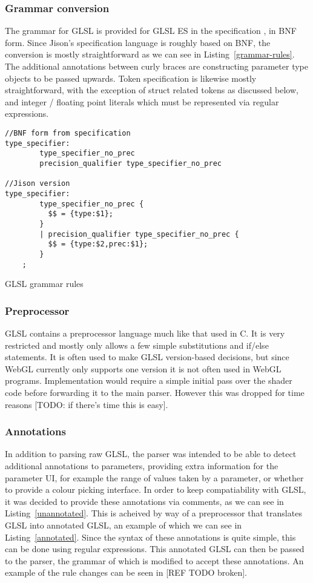 \documentclass[12pt,twoside,notitlepage]{report}
\begin{document}
\subsubsection{Grammar conversion}
The grammar for GLSL is provided for GLSL ES in the specification \cite{glsl-spec}, in BNF form. Since Jison's specification language is roughly based on BNF, the conversion is mostly straightforward as we can see in Listing~\ref{grammar-rules}. The additional annotations between curly braces are constructing parameter type objects to be passed upwards. Token specification is likewise mostly straightforward, with the exception of struct related tokens as discussed below, and integer / floating point literals which must be represented via regular expressions.

\begin{listing}
\label{grammar-rules}
\begin{verbatim}
//BNF form from specification
type_specifier:
        type_specifier_no_prec
        precision_qualifier type_specifier_no_prec

//Jison version
type_specifier:
        type_specifier_no_prec { 
          $$ = {type:$1}; 
        }
        | precision_qualifier type_specifier_no_prec { 
          $$ = {type:$2,prec:$1}; 
        }
	;
\end{verbatim}
\caption{GLSL grammar rules}
\end{listing}

\subsubsection{Preprocessor}
GLSL contains a preprocessor language much like that used in C. It is very restricted and mostly only allows a few simple substitutions and if/else statements. It is often used to make GLSL version-based decisions, but since WebGL currently only supports one version it is not often used in WebGL programs. Implementation would require a simple initial pass over the shader code before forwarding it to the main parser. However this was dropped for time reasons [TODO: if there's time this is easy].

\subsubsection{Annotations}
In addition to parsing raw GLSL, the parser was intended to be able to detect additional annotations to parameters, providing extra information for the parameter UI, for example the range of values taken by a parameter, or whether to provide a colour picking interface. In order to keep compatiability with GLSL, it was decided to provide these annotations via comments, as we can see in Listing~\ref{unannotated}. This is acheived by way of a preprocessor that translates GLSL into annotated GLSL, an example of which we can see in Listing~\ref{annotated}. Since the syntax of these annotations is quite simple, this can be done using regular expressions. This annotated GLSL can then be passed to the parser, the grammar of which is modified to accept these annotations. An example of the rule changes can be seen in [REF TODO broken].
\end{document}
